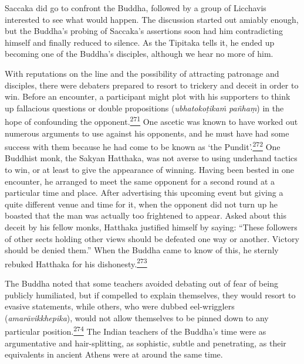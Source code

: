 Saccaka did go to confront the Buddha, followed by a group of Licchavis
interested to see what would happen. The discussion started out amiably
enough, but the Buddha's probing of Saccaka's assertions soon had him
contradicting himself and finally reduced to silence. As the Tipitaka
tells it, he ended up becoming one of the Buddha's disciples, although
we hear no more of him.

With reputations on the line and the possibility of attracting patronage
and disciples, there were debaters prepared to resort to trickery and
deceit in order to win. Before an encounter, a participant might plot
with his supporters to think up fallacious questions or double
propositions (\emph{ubhatokoṭikaṁ pañhaṃ}) in the hope of confounding
the
opponent.\label{footprints_split_010.html_fnref271}\hyperref[footprints_split_024.htmlux5cux23fn271]{\textsuperscript{271}}
One ascetic was known to have worked out numerous arguments to use
against his opponents, and he must have had some success with them
because he had come to be known as `the
Pundit'.\label{footprints_split_010.html_fnref272}\hyperref[footprints_split_024.htmlux5cux23fn272]{\textsuperscript{272}}
One Buddhist monk, the Sakyan Hatthaka, was not averse to using
underhand tactics to win, or at least to give the appearance of winning.
Having been bested in one encounter, he arranged to meet the same
opponent for a second round at a particular time and place. After
advertising this upcoming event but giving a quite different venue and
time for it, when the opponent did not turn up he boasted that the man
was actually too frightened to appear. Asked about this deceit by his
fellow monks, Hatthaka justified himself by saying: ``These followers of
other sects holding other views should be defeated one way or another.
Victory should be denied them.'' When the Buddha came to know of this,
he sternly rebuked Hatthaka for his
dishonesty.\label{footprints_split_010.html_fnref273}\hyperref[footprints_split_024.htmlux5cux23fn273]{\textsuperscript{273}}

The Buddha noted that some teachers avoided debating out of fear of
being publicly humiliated, but if compelled to explain themselves, they
would resort to evasive statements, while others, who were dubbed
eel-wrigglers (\emph{amarāvikkhepika}), would not allow themselves to be
pinned down to any particular
position.\label{footprints_split_010.html_fnref274}\hyperref[footprints_split_024.htmlux5cux23fn274]{\textsuperscript{274}}
The Indian teachers of the Buddha's time were as argumentative and
hair-splitting, as sophistic, subtle and penetrating, as their
equivalents in ancient Athens were at around the same time.

